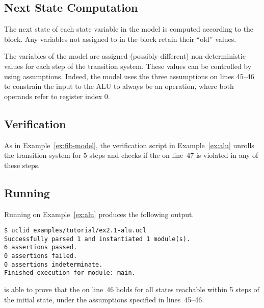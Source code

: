 \subsection{Next State Computation}
The next state of each state variable in the model is computed according to the  block. Any variables not assigned to in the  block retain their ``old'' values.

The  variables of the model are assigned (possibly different) non-deterministic values for each step of the transition system. These values can be controlled by using assumptions. Indeed, the model uses the three assumptions on lines 45--46 to constrain the input to the ALU to always be an  operation, where both operands refer to register index 0.

\subsection{Verification}
As in Example~\ref{ex:fib-model}, the verification script in Example~\ref{ex:alu} unrolls the transition system for 5 steps and checks if the  on line~47 is violated in any of these steps.

\subsection{Running \uclid{}}

Running \uclid{} on Example~\ref{ex:alu} produces the following output.

\begin{Verbatim}[frame=single, samepage=true]
$ uclid examples/tutorial/ex2.1-alu.ucl
Successfully parsed 1 and instantiated 1 module(s).
6 assertions passed.
0 assertions failed.
0 assertions indeterminate.
Finished execution for module: main.
\end{Verbatim}

\uclid{} is able to prove that the  on line~46 holds for all states reachable within 5 steps of the initial state, under the assumptions specified in lines~45--46.
